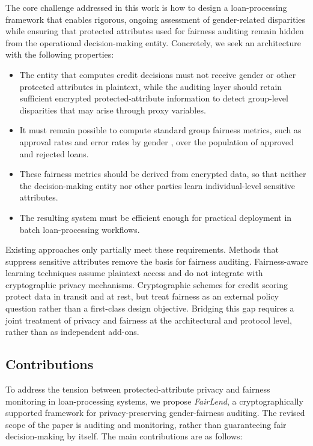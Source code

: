 \documentclass[a4paper,fleqn]{cas-dc}
\begin{document}
The core challenge addressed in this work is how to design a loan-processing framework that enables rigorous, ongoing assessment of gender-related disparities while ensuring that protected attributes used for fairness auditing remain hidden from the operational decision-making entity. Concretely, we seek an architecture with the following properties:
\begin{itemize}
    \item The entity that computes credit decisions must not receive gender or other protected attributes in plaintext, while the auditing layer should retain sufficient encrypted protected-attribute information to detect group-level disparities that may arise through proxy variables.
    \item It must remain possible to compute standard group fairness metrics, such as approval rates and error rates by gender \cite{hardt2016equality}, over the population of approved and rejected loans.
    \item These fairness metrics should be derived from encrypted data, so that neither the decision-making entity nor other parties learn individual-level sensitive attributes.
    \item The resulting system must be efficient enough for practical deployment in batch loan-processing workflows.
\end{itemize}

Existing approaches only partially meet these requirements. Methods that suppress sensitive attributes remove the basis for fairness auditing. Fairness-aware learning techniques assume plaintext access and do not integrate with cryptographic privacy mechanisms. Cryptographic schemes for credit scoring protect data in transit and at rest, but treat fairness as an external policy question rather than a first-class design objective. Bridging this gap requires a joint treatment of privacy and fairness at the architectural and protocol level, rather than as independent add-ons.

\color{red}
\subsection{Contributions}

To address the tension between protected-attribute privacy and fairness monitoring in loan-processing systems, we propose \emph{FairLend}, a cryptographically supported framework for privacy-preserving gender-fairness auditing. The revised scope of the paper is auditing and monitoring, rather than guaranteeing fair decision-making by itself. The main contributions are as follows:
\end{document}
